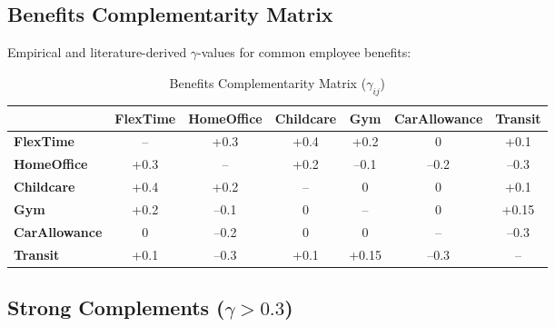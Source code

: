 \subsection{Benefits Complementarity Matrix}
\label{subsec:benefits-gamma-matrix}

Empirical and literature-derived $\gamma$-values for common employee benefits:

\begin{table}[htbp]
\centering
\caption{Benefits Complementarity Matrix ($\gamma_{ij}$)}
\label{tab:benefits-complementarity}
\renewcommand{\arraystretch}{1.2}
\small
\begin{tabular}{@{}lcccccc@{}}
\toprule
& \textbf{FlexTime} & \textbf{HomeOffice} & \textbf{Childcare} & \textbf{Gym} & \textbf{CarAllowance} & \textbf{Transit} \\
\midrule
\textbf{FlexTime} & -- & +0.3 & +0.4 & +0.2 & 0 & +0.1 \\
\textbf{HomeOffice} & +0.3 & -- & +0.2 & --0.1 & --0.2 & --0.3 \\
\textbf{Childcare} & +0.4 & +0.2 & -- & 0 & 0 & +0.1 \\
\textbf{Gym} & +0.2 & --0.1 & 0 & -- & 0 & +0.15 \\
\textbf{CarAllowance} & 0 & --0.2 & 0 & 0 & -- & --0.3 \\
\textbf{Transit} & +0.1 & --0.3 & +0.1 & +0.15 & --0.3 & -- \\
\bottomrule
\end{tabular}
\end{table}

\subsection{Strong Complements ($\gamma > 0.3$)}
\label{subsec:strong-complements}

